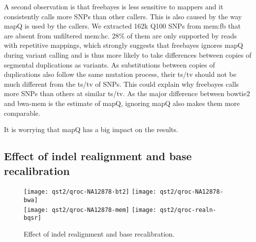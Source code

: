 \documentclass{bioinfo}
\newcommand{\textssf}[1]{\textsf{\footnotesize #1}}
\begin{document}
A second observation is that \textssf{freebayes} is less sensitive to mappers and it
consistently calls more SNPs than other callers. This is also caused by the way
mapQ is used by the callers. We extracted 162k Q100 SNPs from \textssf{mem:fb}
that are absent from unfiltered \textssf{mem:hc}. 28\% of them are only
supported by reads with repetitive mappings, which strongly suggests that
\textssf{freebayes} ignores mapQ during variant calling and is thus more likely
to take differences between copies of segmental duplications as variants. As
substitutions between copies of duplications also follow the same mutation
process, their ts/tv should not be much different from the ts/tv of SNPs. This
could explain why \textssf{freebayes} calls more SNPs than others at similar
ts/tv. As the major difference between \textssf{bowtie2} and \textssf{bwa-mem}
is the estimate of mapQ, ignoring mapQ also makes them more comparable.

It is worrying that mapQ has a big impact on the results.

\subsection{Effect of indel realignment and base recalibration}

\begin{figure*}[!hp]
\centering\texttt{[image: qst2/qroc-NA12878-bt2]}
\centering\texttt{[image: qst2/qroc-NA12878-bwa]}\\
\centering\texttt{[image: qst2/qroc-NA12878-mem]}
\centering\texttt{[image: qst2/qroc-realn-bqsr]}
\caption{Effect of indel realignment and base recalibration.}\label{fig:qroc2} \end{figure*}

\end{document}

